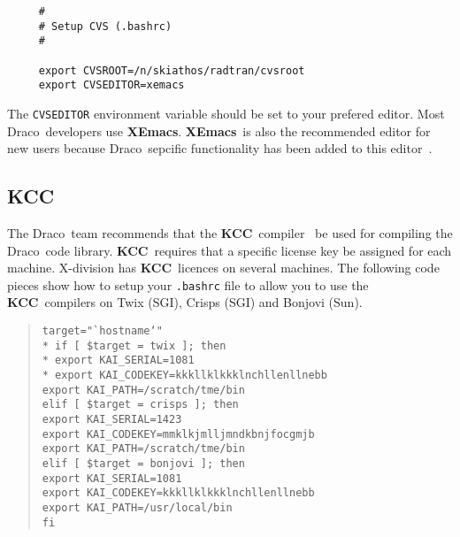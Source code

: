 \documentclass[11pt]{nmemo}
\newcommand{\comp}[1]{\normalfont\normalsize\texttt{#1}}
\newcommand{\draco}{{\normalfont\sffamily Draco}}
\newcommand{\kcc}{{\normalfont\bfseries KCC}}
\newcommand{\xemacs}{{\normalfont\bfseries XEmacs}}
\begin{document}
\begin{verbatim}
     #
     # Setup CVS (.bashrc)
     #

     export CVSROOT=/n/skiathos/radtran/cvsroot
     export CVSEDITOR=xemacs
\end{verbatim}

The \comp{CVSEDITOR} environment variable should be set to your
prefered editor.  Most \draco\ developers use \xemacs.   \xemacs\ is
also the recommended editor for new users because \draco\ sepcific
functionality has been added to this editor~\cite{xtm:9909}.

\subsection{KCC}

The \draco\ team recommends that the \kcc\ compiler~\cite{kai} be used
for compiling the \draco\ code library.  \kcc\ requires that a
specific license key be assigned for each machine.  X-division has
\kcc\ licences on several machines.  The following code pieces show
how to setup your \comp{.bashrc} file to allow you to use the \kcc\ 
compilers on Twix (SGI), Crisps (SGI) and Bonjovi (Sun).

\begin{verse}
\texttt{target="`hostname`"\\*
     if [ \$target = twix ]; then\\*
\hspace*{0.25in}         export KAI\_SERIAL=1081\\*
\hspace*{0.25in}         export KAI\_CODEKEY=kkkllklkkklnchllenllnebb\\
\hspace*{0.25in}         export KAI\_PATH=/scratch/tme/bin\\
    elif [ \$target = crisps ]; then\\
\hspace*{0.25in}         export KAI\_SERIAL=1423\\
\hspace*{0.25in}         export KAI\_CODEKEY=mmklkjmlljmndkbnjfocgmjb\\
\hspace*{0.25in}         export KAI\_PATH=/scratch/tme/bin\\
    elif [ \$target = bonjovi ]; then\\
\hspace*{0.25in}         export KAI\_SERIAL=1081\\
\hspace*{0.25in}         export KAI\_CODEKEY=kkkllklkkklnchllenllnebb\\
\hspace*{0.25in}         export KAI\_PATH=/usr/local/bin\\
    fi
}
\end{verse}
\end{document}
